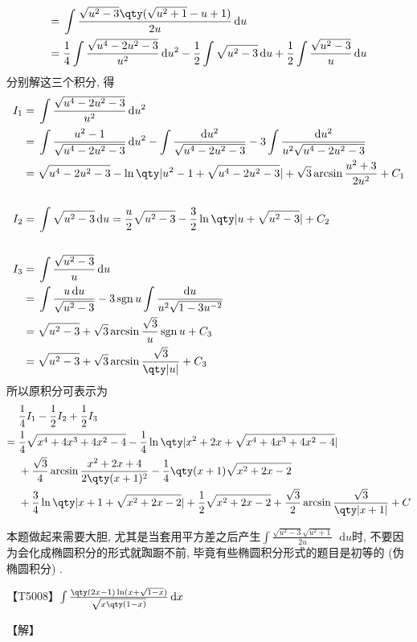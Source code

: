\documentclass{ctexbook}
\DeclareMathOperator{\sgn}{sgn}
\newcommand*{\dif}{\mathop{}\!\mathrm{d}}
\begin{document}
{\begin{align*}
={}&\int\frac{\sqrt{u^{2}-3}\qty(\sqrt{u^{2}+1}-u+1)}{2u}\dif{u}\\
={}&\frac{1}{4}\int\frac{\sqrt{u^{4}-2u^{2}-3}}{u^{2}}\dif{u^{2}}-\frac{1}{2}\int\sqrt{u^{2}-3}\dif{u}+\frac{1}{2}\int\frac{\sqrt{u^{2}-3}}{u}\dif{u}
\end{align*}
分别解这三个积分, 得
\begin{align*}
I_{1}={}&\int\frac{\sqrt{u^{4}-2u^{2}-3}}{u^{2}}\dif{u^{2}}\\
={}&\int\frac{u^{2}-1}{\sqrt{u^{4}-2u^{2}-3}}\dif{u^{2}}-\int\frac{\dif{u^{2}}}{\sqrt{u^{4}-2u^{2}-3}}-3\int\frac{\dif{u^{2}}}{u^{2}\sqrt{u^{4}-2u^{2}-3}}\\
={}&\sqrt{u^{4}-2u^{2}-3}-\ln\qty|u^{2}-1+\sqrt{u^{4}-2u^{2}-3}|+\sqrt{3}\arcsin{\frac{u^{2}+3}{2u^{2}}}+C_{1}\\
\\
I_{2}={}&\int\sqrt{u^{2}-3}\dif{u}=\frac{u}{2}\sqrt{u^{2}-3}-\frac{3}{2}\ln\qty|u+\sqrt{u^{2}-3}|+C_{2}\\
\\
I_{3}={}&\int\frac{\sqrt{u^{2}-3}}{u}\dif{u}\\
={}&\int\frac{u\dif{u}}{\sqrt{u^{2}-3}}-3\sgn{u}\int\frac{\dif{u}}{u^{2}\sqrt{1-3u^{-2}}}\\
={}&\sqrt{u^{2}-3}+\sqrt{3}\arcsin{\frac{\sqrt{3}}{u}}\sgn{u}+C_{3}\\
={}&\sqrt{u^{2}-3}+\sqrt{3}\arcsin{\frac{\sqrt{3}}{\qty|u|}}+C_{3}
\end{align*}
所以原积分可表示为
\begin{align*}
{}&\frac{1}{4}I_{1}-\frac{1}{2}I_{2}+\frac{1}{2}I_{3}\\
={}&\frac{1}{4}\sqrt{x^{4}+4x^{3}+4x^{2}-4}-\frac{1}{4}\ln\qty|x^{2}+2x+\sqrt{x^{4}+4x^{3}+4x^{2}-4}|\\
{}&+\frac{\sqrt{3}}{4}\arcsin{\frac{x^{2}+2x+4}{2\qty(x+1)^{2}}}-\frac{1}{4}\qty(x+1)\sqrt{x^{2}+2x-2}\\
{}&+\frac{3}{4}\ln\qty|x+1+\sqrt{x^{2}+2x-2}|+\frac{1}{2}\sqrt{x^{2}+2x-2}+\frac{\sqrt{3}}{2}\arcsin{\frac{\sqrt{3}}{\qty|x+1|}}+C
\end{align*}\par
{\kaishu 本题做起来需要大胆, 尤其是当套用平方差之后产生$\int\frac{\sqrt{u^{2}-3}\sqrt{u^{2}+1}}{2u}\dif{u}$时, 不要因为会化成椭圆积分的形式就踟蹰不前, 毕竟有些椭圆积分形式的题目是初等的 (伪椭圆积分) . \par}
【T5008】$\int\frac{\qty(2x-1)\ln(x+\sqrt{1-x})}{\sqrt{x\qty(1-x)}}\dif{x}$\par
【解】
\begin{align*}

\end{align*}}
\end{document}
